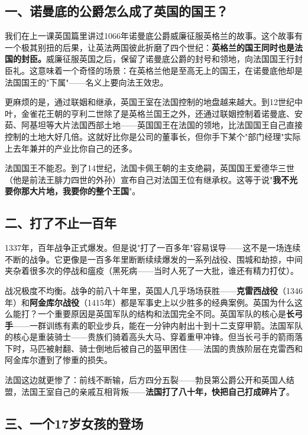 \documentclass[a4paper,12pt]{ctexart}
\begin{document}
\subsection*{一、诺曼底的公爵怎么成了英国的国王？}

我们在上一课英国篇里讲过1066年诺曼底公爵威廉征服英格兰的故事。这个故事有一个极其别扭的后果，让英法两国彼此折磨了四个世纪：\textbf{英格兰的国王同时也是法国的封臣。}威廉征服英国之后，保留了诺曼底公爵的封号和领地，向法国国王行封臣礼。这意味着一个奇怪的场景：在英格兰他是至高无上的国王，在诺曼底他却是法国国王的"下属"——名义上要向法王效忠。

更麻烦的是，通过联姻和继承，英国王室在法国控制的地盘越来越大。到12世纪中叶，金雀花王朝的亨利二世除了是英格兰国王之外，还通过联姻控制着诺曼底、安茹、阿基坦等大片法国西部土地——英国国王在法国的领地，比法国国王自己直接控制的土地大好几倍。这就好比你是公司的董事长，但你手下某个"部门经理"实际上去年兼并的产业比你自己的还多。

法国国王不能忍。到了14世纪，法国卡佩王朝的主支绝嗣，英国国王爱德华三世（他是前法王腓力四世的外孙）宣布自己对法国王位有继承权。这等于说"\textbf{我不光要你那大片地，我要你的整个王国}"。

\subsection*{二、打了不止一百年}

1337年，百年战争正式爆发。但是说"打了一百多年"容易误导——这不是一场连续不断的战争。它更像是一百多年里断断续续爆发的一系列战役、围城和劫掠，中间夹杂着很多次的停战和瘟疫（黑死病——当时人死了一大批，谁还有精力打仗）。

战况极度不均衡。战争的前八十年里，英国人几乎场场获胜——\textbf{克雷西战役}（1346年）和\textbf{阿金库尔战役}（1415年）都是军事史上以少胜多的经典案例。英国为什么这么能打？一个重要原因是英国军队的结构和法国完全不同。英国军队的核心是\textbf{长弓手}——一群训练有素的职业步兵，能在一分钟内射出十到十二支穿甲箭。法国军队的核心是重装骑士——贵族们骑着高头大马、穿着重甲冲锋。但当长弓手的箭雨落下时，马匹被射翻、骑士倒地后被自己的盔甲困住——法国的贵族阶层在克雷西和阿金库尔遭到了惨重的损失。

法国这边就更惨了：前线不断输，后方四分五裂——勃艮第公爵公开和英国人结盟，法国王室自己的亲戚互相背叛——\textbf{法国打了八十年，快把自己打成碎片了}。

\subsection*{三、一个17岁女孩的登场}
\end{document}
